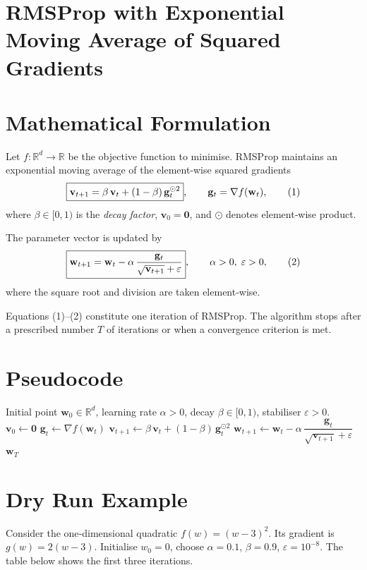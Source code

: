 \documentclass{article}
\begin{document}
\section*{RMSProp with Exponential Moving Average of Squared Gradients}

\section*{Mathematical Formulation}
Let $f:\mathbb{R}^{d}\rightarrow\mathbb{R}$ be the objective function to minimise.  
RMSProp maintains an exponential moving average of the element‑wise squared gradients
\[
\boxed{%
\mathbf v_{t+1}= \beta\,\mathbf v_{t}+ (1-\beta)\,\mathbf g_{t}^{\odot 2}},\qquad 
\mathbf g_{t}= \nabla f(\mathbf w_{t}),
\tag{1}
\]
where $\beta\in[0,1)$ is the \emph{decay factor}, $\mathbf v_{0}= \mathbf 0$, and $\odot$ denotes element‑wise product.  

The parameter vector is updated by
\[
\boxed{%
\mathbf w_{t+1}= \mathbf w_{t}
-\alpha\,\frac{\mathbf g_{t}}{\sqrt{\mathbf v_{t+1}}+\varepsilon}},\qquad
\alpha>0,\;\varepsilon>0,
\tag{2}
\]
where the square root and division are taken element‑wise.  

Equations (1)–(2) constitute one iteration of RMSProp.  The algorithm stops after a prescribed
number $T$ of iterations or when a convergence criterion is met.

\section*{Pseudocode}
\begin{algorithm}[H]
\caption{RMSProp (deterministic gradients)}\label{alg:rmsprop}
\begin{algorithmic}[1]
\Require Initial point $\mathbf w_{0}\in\mathbb{R}^{d}$, learning rate $\alpha>0$, decay $\beta\in[0,1)$, stabiliser $\varepsilon>0$.
\State $\mathbf v_{0}\gets\mathbf 0$
    \State $\mathbf g_{t}\gets\nabla f(\mathbf w_{t})$ 
    \State $\mathbf v_{t+1}\gets \beta\,\mathbf v_{t}+ (1-\beta)\,\mathbf g_{t}^{\odot 2}$ 
    \State $\mathbf w_{t+1}\gets \mathbf w_{t}
          -\alpha\,\dfrac{\mathbf g_{t}}{\sqrt{\mathbf v_{t+1}}+\varepsilon}$ 
\EndFor
\State \Return $\mathbf w_{T}$
\end{algorithmic}
\end{algorithm}

\section*{Dry Run Example}
Consider the one‑dimensional quadratic $f(w)=(w-3)^{2}$.  
Its gradient is $g(w)=2(w-3)$.  Initialise $w_{0}=0$, choose $\alpha=0.1$, $\beta=0.9$, $\varepsilon=10^{-8}$.
The table below shows the first three iterations.
\end{document}

